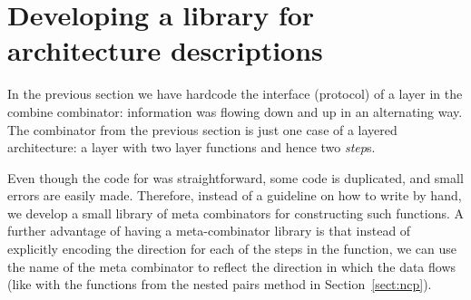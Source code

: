 \documentclass{llncs}
\begin{document}


\section{Developing a library for architecture descriptions} \label{sect:lib}

In the previous section we have hardcode the interface (protocol) of a layer in the combine combinator: information was flowing down and up in an alternating way. The  combinator from the previous section is just one case of a layered architecture: a layer with two layer functions and hence two {\em step}s.


Even though the code for  was straightforward, some code is duplicated, and small errors are easily made. Therefore, instead of a guideline on how to write  by hand, we develop a small library of meta combinators for constructing such  functions. A further  advantage of having  a meta-combinator library is that instead of explicitly encoding the direction for each of the steps in the  function, we can use the name of the meta combinator to reflect the direction in which the data flows (like with the  functions from the nested pairs method in Section~\ref{sect:ncp}).


\end{document}
